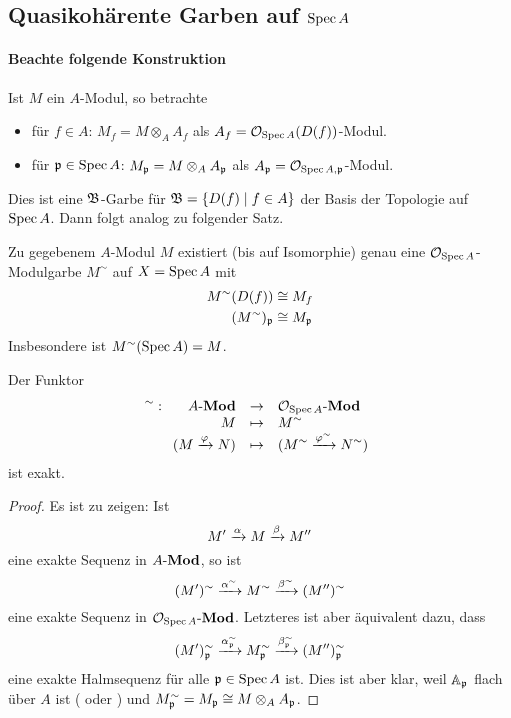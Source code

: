\subsection{Quasikohärente Garben auf $\operatorname{Spec} A$}

\paragraph{Beachte folgende Konstruktion}
Ist $M$ ein $A$-Modul, so betrachte
\begin{itemize}
  \item für $f \in A$: $M_f = M \otimes_A A_f$ 
    als $A_f = \mathcal{O}_{\operatorname{Spec} A}(D(f))$-Modul.
  \item für $\mathfrak{p} \in \operatorname{Spec} A$: $M_\mathfrak{p} = M\otimes_A A_\mathfrak{p}$
    als $A_\mathfrak{p} = \mathcal{O}_{\operatorname{Spec} A,\mathfrak{p}}$-Modul.
\end{itemize}
Dies ist eine $\mathfrak B$-Garbe für $\mathfrak B = \{D(f)\mid f\in A\}$ der Basis 
der Topologie auf $\operatorname{Spec} A$. Dann folgt analog zu 
 folgender Satz.

\begin{satz}
    \label{satz:a modul hat ein o spec a modulgarbe}
    Zu gegebenem $A$-Modul $M$ existiert (bis auf Isomorphie) genau eine
    $\mathcal{O}_{\operatorname{Spec} A}$-Modulgarbe $M^\sim$ auf $X = \operatorname{Spec} A$ mit
    \begin{align*}
        M^\sim (D(f)) &\cong M_f\\
        (M^\sim)_\mathfrak{p} &\cong M_\mathfrak{p}
    \end{align*} 
    Insbesondere ist $M^\sim(\operatorname{Spec} A) = M$.
\end{satz}



\begin{satz}
    \label{satz:sim exakt}
    Der Funktor
    \[
        ^\sim: \funcdef{ \Moduln{A} & \to & \Moduln{\O_{\Spec A}} \\
            M & \mapsto & M^\sim\\
            (M \xto{\varphi} N) & \mapsto &  (M^\sim \xto{\varphi^\sim}N^\sim)}
    \]
    ist exakt.
\end{satz}
\begin{proof}
    Es ist zu zeigen: Ist
    \[ M' \xrightarrow\alpha M \xrightarrow\beta M''\]
    eine exakte Sequenz in $A\text{-}\mathbf{Mod}$, so ist
    \[ (M')^\sim \xrightarrow{\alpha^\sim} M^\sim \xrightarrow{\beta^\sim} (M'')^\sim\]
    eine exakte Sequenz in $\mathcal{O}_{\operatorname{Spec} A}\text{-}\mathbf{Mod}$. Letzteres ist aber
    äquivalent dazu, dass
    \[ (M')_\mathfrak{p}^\sim \xrightarrow{\alpha_\mathfrak{p}^\sim} M_\mathfrak{p}^\sim \xrightarrow{\beta_\mathfrak{p}^\sim}
         (M'')_\mathfrak{p}^\sim\]
    eine exakte Halmsequenz für alle $\mathfrak{p}\in\operatorname{Spec} A$ ist.
    Dies ist aber klar, weil $\mathbb{A}_\mathfrak{p}$ flach über $A$ ist 
    (\autocite[Example 9.1.1]{hartshorne1977algebraic} oder
    \autocite[Abschnitt 7 Satz 8]{bosch2009algebra}) und
    $M_\mathfrak{p}^\sim = M_\mathfrak{p} \cong M\otimes_A A_\mathfrak{p}$. 
\end{proof}

